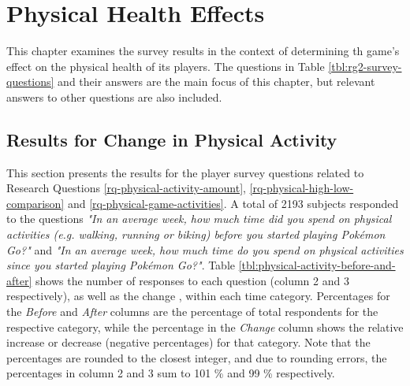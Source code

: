 \chapter{Physical Health Effects}
\label{chapter:player-study-physical}

This chapter examines the survey results in the context of determining th game's effect on the physical health of its players. The questions in Table \ref{tbl:rg2-survey-questions} and their answers are the main focus of this chapter, but relevant answers to other questions are also included.

\section{Results for Change in Physical Activity}

This section presents the results for the player survey questions related to Research Questions \ref{rq-physical-activity-amount}, \ref{rq-physical-high-low-comparison} and \ref{rq-physical-game-activities}. A total of 2193 subjects responded to the questions \emph{"In an average week, how much time did you spend on physical activities (e.g. walking, running or biking) before you started playing Pokémon Go?"} and \emph{"In an average week, how much time do you spend on physical activities since you started playing Pokémon Go?"}. Table \ref{tbl:physical-activity-before-and-after} shows the number of responses to each question (column 2 and 3 respectively), as well as the change , within each time category. Percentages for the \emph{Before} and \emph{After} columns are the percentage of total respondents for the respective category, while the percentage in the \emph{Change} column shows the relative increase or decrease (negative percentages) for that category. Note that the percentages are rounded to the closest integer, and due to rounding errors, the percentages in column 2 and 3 sum to 101 \% and 99 \% respectively.

